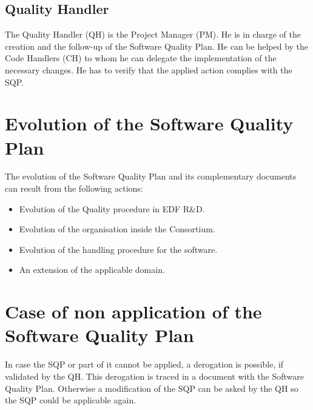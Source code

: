 \subsection{Quality Handler}

The Quality Handler (QH) is the \telemacsystem{} Project Manager (PM). He is in
charge of the creation and the follow-up of the Software Quality Plan. He can
be helped by the Code Handlers (CH) to whom he can delegate the implementation
of the necessary changes. He has to verify that the applied action complies
with the SQP\@.

\section{Evolution of the Software Quality Plan}

The evolution of the Software Quality Plan and its complementary documents can
result from the following actions:
\begin{itemize}
\item Evolution of the Quality procedure in EDF R\&D.
\item Evolution of the organisation inside the Consortium.
\item Evolution of the handling procedure for the software.
\item An extension of the applicable domain.
\end{itemize}

\section{Case of non application of the Software Quality Plan}

In case the SQP or part of it cannot be applied, a derogation is possible, if
validated by the QH\@. This derogation is traced in a document with the Software
Quality Plan. Otherwise a modification of the SQP can be asked by the QH so
the SQP could be applicable again.
